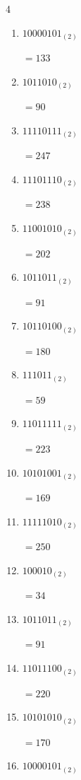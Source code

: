 \begin{multicols}{4}
\begin{enumerate}
        $=159$

  \item $10000101_{(2)}$

        $=133$

  \item $1011010_{(2)}$

        $=90$

\columnbreak %

  \item $11110111_{(2)}$

        $=247$

  \item $11101110_{(2)}$

        $=238$

  \item $11001010_{(2)}$

        $=202$

  \item $1011011_{(2)}$

        $=91$

  \item $10110100_{(2)}$

        $=180$

  \item $111011_{(2)}$

        $=59$

  \item $11011111_{(2)}$

        $=223$

  \item $10101001_{(2)}$

        $=169$

  \item $11111010_{(2)}$

        $=250$

  \item $100010_{(2)}$

        $=34$

  \item $1011011_{(2)}$

        $=91$

  \item $11011100_{(2)}$

        $=220$

  \item $10101010_{(2)}$

        $=170$

  \item $10000101_{(2)}$


\end{enumerate}
\end{multicols}
